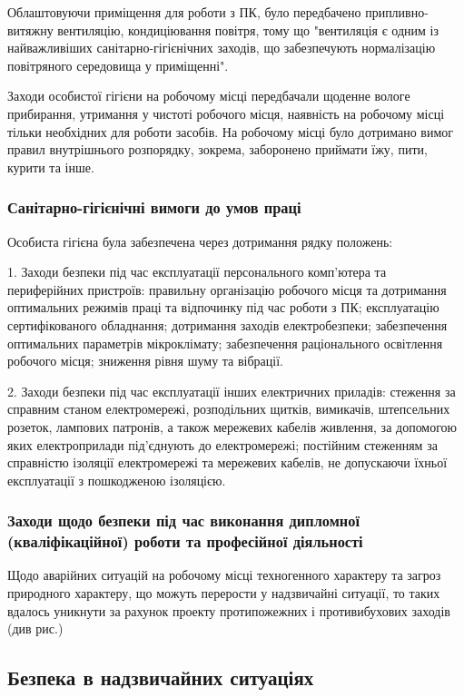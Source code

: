 Облаштовуючи приміщення для роботи з ПК, було передбачено припливно-витяжну вентиляцію, кондиціювання повітря, тому що "вентиляція є одним із найважливіших санітарно-гігієнічних заходів, що забезпечують нормалізацію повітряного середовища у приміщенні".

Заходи особистої гігієни на робочому місці передбачали щоденне вологе прибирання, утримання у чистоті робочого місця, наявність на робочому місці тільки необхідних для роботи засобів. На робочому місці було дотримано вимог правил внутрішнього розпорядку, зокрема, заборонено приймати їжу, пити, курити та інше.

\subsubsection{Санітарно-гігієнічні вимоги до умов праці}

Особиста гігієна була забезпечена через дотримання рядку положень:

1. Заходи безпеки під час експлуатації персонального комп’ютера та периферійних пристроїв: правильну організацію робочого місця та дотримання оптимальних режимів праці та відпочинку під час роботи з ПК; експлуатацію сертифікованого обладнання; дотримання заходів електробезпеки; забезпечення оптимальних параметрів мікроклімату; забезпечення раціонального освітлення робочого місця; зниження рівня шуму та вібрації.

2. Заходи безпеки під час експлуатації інших електричних приладів: стеження за справним станом електромережі, розподільних щитків, вимикачів, штепсельних розеток, лампових патронів, а також мережевих кабелів живлення, за допомогою яких електроприлади під’єднують до електромережі; постійним  стеженням за справністю ізоляції електромережі та мережевих кабелів, не допускаючи їхньої експлуатації з пошкодженою ізоляцією.


\subsubsection{Заходи щодо безпеки під час виконання дипломної (кваліфікаційної) роботи та професійної діяльності}

Щодо аварійних ситуацій на робочому місці техногенного характеру та загроз природного характеру, що можуть перерости у надзвичайні ситуації, то таких вдалось уникнути за рахунок проекту протипожежних і противибухових заходів (див рис.)

\subsection{Безпека в надзвичайних ситуаціях}

